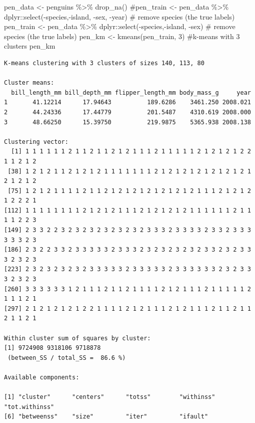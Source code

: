 \documentclass[
  letterpaper,
  DIV=11,
  numbers=noendperiod]{scrreprt}
\newenvironment{Shaded}{\begin{snugshade}}{\end{snugshade}}
\newcommand{\CommentTok}[1]{\textcolor[rgb]{0.37,0.37,0.37}{#1}}
\newcommand{\DecValTok}[1]{\textcolor[rgb]{0.68,0.00,0.00}{#1}}
\newcommand{\FunctionTok}[1]{\textcolor[rgb]{0.28,0.35,0.67}{#1}}
\newcommand{\NormalTok}[1]{\textcolor[rgb]{0.00,0.23,0.31}{#1}}
\newcommand{\OtherTok}[1]{\textcolor[rgb]{0.00,0.23,0.31}{#1}}
\newcommand{\SpecialCharTok}[1]{\textcolor[rgb]{0.37,0.37,0.37}{#1}}
\begin{document}
\begin{Shaded}
\begin{Highlighting}[]
\NormalTok{pen\_data }\OtherTok{\textless{}{-}}\NormalTok{ penguins }\SpecialCharTok{\%\textgreater{}\%} \FunctionTok{drop\_na}\NormalTok{() }
\CommentTok{\#pen\_train \textless{}{-} pen\_data  \%\textgreater{}\% dplyr::select({-}species,{-}island, {-}sex, {-}year) \# remove species (the true labels)}
\NormalTok{pen\_train }\OtherTok{\textless{}{-}}\NormalTok{ pen\_data  }\SpecialCharTok{\%\textgreater{}\%}\NormalTok{ dplyr}\SpecialCharTok{::}\FunctionTok{select}\NormalTok{(}\SpecialCharTok{{-}}\NormalTok{species,}\SpecialCharTok{{-}}\NormalTok{island, }\SpecialCharTok{{-}}\NormalTok{sex) }\CommentTok{\# remove species (the true labels)}
\NormalTok{pen\_km }\OtherTok{\textless{}{-}} \FunctionTok{kmeans}\NormalTok{(pen\_train, }\DecValTok{3}\NormalTok{) }\CommentTok{\#k{-}means with 3 clusters}
\NormalTok{pen\_km}
\end{Highlighting}
\end{Shaded}

\begin{verbatim}
K-means clustering with 3 clusters of sizes 140, 113, 80

Cluster means:
  bill_length_mm bill_depth_mm flipper_length_mm body_mass_g     year
1       41.12214      17.94643          189.6286    3461.250 2008.021
2       44.24336      17.44779          201.5487    4310.619 2008.000
3       48.66250      15.39750          219.9875    5365.938 2008.138

Clustering vector:
  [1] 1 1 1 1 1 1 2 1 1 2 1 1 2 1 2 1 1 1 2 1 1 1 1 1 2 1 2 1 2 1 2 2 1 1 2 1 2
 [38] 1 2 1 2 1 1 2 1 2 1 2 1 1 1 1 1 1 1 2 1 2 1 2 1 2 1 2 1 2 1 2 1 2 1 2 1 2
 [75] 1 2 1 2 1 1 1 1 2 1 1 2 1 2 1 2 1 2 1 2 1 2 1 2 1 1 1 2 1 2 1 2 1 2 2 2 1
[112] 1 1 1 1 1 1 1 1 2 1 2 1 2 1 1 1 2 1 2 1 2 1 2 1 1 1 1 1 1 2 1 1 1 1 2 2 3
[149] 2 3 3 2 2 3 2 3 2 3 2 3 2 3 2 3 2 3 3 3 2 3 3 3 3 2 3 3 2 3 3 3 3 3 3 2 3
[186] 2 3 2 2 3 3 2 3 3 3 3 3 2 3 3 3 2 3 2 3 2 3 2 3 2 3 3 2 3 2 3 3 3 2 3 2 3
[223] 2 3 2 3 2 3 2 3 2 3 3 3 3 3 2 3 3 3 3 3 2 3 3 3 3 3 3 2 3 2 3 3 3 2 3 2 3
[260] 3 3 3 3 3 3 1 2 1 1 1 2 1 1 2 1 1 1 1 2 1 2 1 1 1 2 1 1 1 1 1 2 1 1 1 2 1
[297] 2 1 2 1 2 1 2 1 2 2 1 1 1 1 2 1 2 1 1 1 2 1 2 1 1 1 2 1 1 2 1 1 2 1 1 2 1

Within cluster sum of squares by cluster:
[1] 9724908 9318106 9718878
 (between_SS / total_SS =  86.6 %)

Available components:

[1] "cluster"      "centers"      "totss"        "withinss"     "tot.withinss"
[6] "betweenss"    "size"         "iter"         "ifault"      
\end{verbatim}
\end{document}
